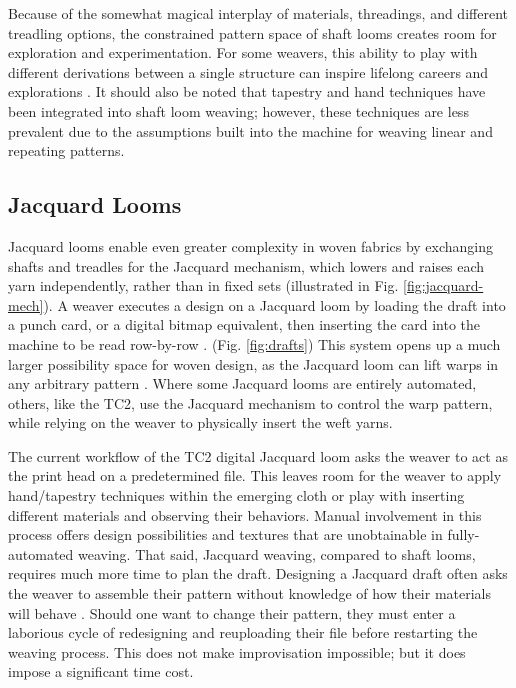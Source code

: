 Because of the somewhat magical interplay of materials, threadings, and different treadling options, the constrained pattern space of shaft looms creates room for exploration and experimentation. For some weavers, this ability to play with different derivations between a single structure can inspire lifelong careers and explorations \cite{kesler-simpson_crackle_2022, franklin_weaving_2018}. It should also be noted that tapestry and hand techniques have been integrated into shaft loom weaving; however, these techniques are less prevalent due to the assumptions built into the machine for weaving linear and repeating patterns. 

\subsection{Jacquard Looms}

Jacquard looms enable even greater complexity in woven fabrics by exchanging shafts and treadles for the Jacquard mechanism, which lowers and raises each yarn independently, rather than in fixed sets (illustrated in Fig. \ref{fig:jacquard-mech}). A weaver executes a design on a Jacquard loom by loading the draft into a punch card, or a digital bitmap equivalent, then inserting the card into the machine to be read row-by-row \cite{fernaeus_revisiting_2012}. (Fig. \ref{fig:drafts}) This system opens up a much larger possibility space for woven design, as the Jacquard loom can lift warps in any arbitrary pattern \cite{holyoke_digital_2013, ng_innovative_2013}. Where some Jacquard looms are entirely automated, others, like the TC2, use the Jacquard mechanism to control the warp pattern, while relying on the weaver to physically insert the weft yarns. 

The current workflow of the TC2 digital Jacquard loom asks the weaver to act as the print head on a predetermined file. This leaves room for the weaver to apply hand/tapestry techniques within the emerging cloth or play with inserting different materials and observing their behaviors. Manual involvement in this process offers design possibilities and textures that are unobtainable in fully-automated weaving. That said, Jacquard weaving, compared to shaft looms, requires much more time to plan the draft. Designing a Jacquard draft often asks the weaver to assemble their pattern without knowledge of how their materials will behave \cite{schlein_woven_2007, ng_innovative_2013}. Should one want to change their pattern, they must enter a laborious cycle of redesigning and reuploading their file before restarting the weaving process. This does not make improvisation impossible; but it does impose a significant time cost. 

